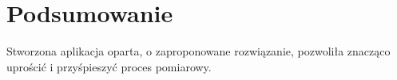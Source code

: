 \section{Podsumowanie}
Stworzona aplikacja oparta, o zaproponowane rozwiązanie, pozwoliła znacząco uprościć i przyśpieszyć proces pomiarowy.
